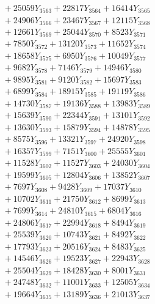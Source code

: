 \documentclass[a4paper,10pt]{article}
\begin{document}
{\begin{align}
&\;  + 25059 Y_{3563} + 22817 Y_{3564} + 16414 Y_{3565} \\[0.3ex]
&\;  + 24906 Y_{3566} + 23467 Y_{3567} + 12115 Y_{3568} \\[0.5ex]\allowbreak
&\;  + 12661 Y_{3569} + 25044 Y_{3570} + 8523 Y_{3571} \\[0.3ex]
&\;  + 7850 Y_{3572} + 13120 Y_{3573} + 11652 Y_{3574} \\[0.3ex]
&\;  + 18658 Y_{3575} + 6950 Y_{3576} + 10049 Y_{3577} \\[0.3ex]
&\;  + 9682 Y_{3578} + 7146 Y_{3579} + 14946 Y_{3580} \\[0.3ex]
&\;  + 9895 Y_{3581} + 9120 Y_{3582} + 15697 Y_{3583} \\[0.3ex]
&\;  + 6899 Y_{3584} + 18915 Y_{3585} + 19119 Y_{3586} \\[0.3ex]
&\;  + 14730 Y_{3587} + 19136 Y_{3588} + 13983 Y_{3589} \\[0.3ex]
&\;  + 15639 Y_{3590} + 22344 Y_{3591} + 13101 Y_{3592} \\[0.3ex]
&\;  + 13630 Y_{3593} + 15879 Y_{3594} + 14878 Y_{3595} \\[0.3ex]
&\;  + 8575 Y_{3596} + 13321 Y_{3597} + 24920 Y_{3598} \\[0.5ex]\allowbreak
&\;  + 16357 Y_{3599} + 7151 Y_{3600} + 25555 Y_{3601} \\[0.3ex]
&\;  + 11528 Y_{3602} + 11527 Y_{3603} + 24030 Y_{3604} \\[0.3ex]
&\;  + 19599 Y_{3605} + 12804 Y_{3606} + 13852 Y_{3607} \\[0.3ex]
&\;  + 7697 Y_{3608} + 9428 Y_{3609} + 17037 Y_{3610} \\[0.3ex]
&\;  + 10702 Y_{3611} + 21750 Y_{3612} + 8699 Y_{3613} \\[0.3ex]
&\;  + 7699 Y_{3614} + 24810 Y_{3615} + 6804 Y_{3616} \\[0.3ex]
&\;  + 24806 Y_{3617} + 22994 Y_{3618} + 8494 Y_{3619} \\[0.3ex]
&\;  + 25539 Y_{3620} + 10743 Y_{3621} + 8492 Y_{3622} \\[0.3ex]
&\;  + 17793 Y_{3623} + 20516 Y_{3624} + 8483 Y_{3625} \\[0.3ex]
&\;  + 14546 Y_{3626} + 19523 Y_{3627} + 22943 Y_{3628} \\[0.5ex]\allowbreak
&\;  + 25504 Y_{3629} + 18428 Y_{3630} + 8001 Y_{3631} \\[0.3ex]
&\;  + 24748 Y_{3632} + 11001 Y_{3633} + 12505 Y_{3634} \\[0.3ex]
&\;  + 19664 Y_{3635} + 13189 Y_{3636} + 21013 Y_{3637} \\[0.3ex]

\end{align}}
\end{document}
